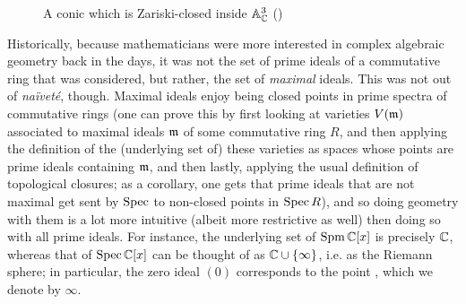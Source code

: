 \begin{example}
\begin{enumerate}
\begin{figure}[H]
                            \caption{A conic which is Zariski-closed inside $\mathbb{A}^3_{\mathbb{C}}$ (\cite[Figure 3.4]{risingsea})}
                            \label{fig: conic}
                        \end{figure}
                \end{enumerate}
            \end{example}
            
            \begin{remark}
                Historically, because mathematicians were more interested in complex algebraic geometry back in the days, it was not the set of prime ideals of a commutative ring that was considered, but rather, the set of \textit{maximal} ideals. This was not out of \textit{na\"ivet\'e}, though. Maximal ideals enjoy being closed points in prime spectra of commutative rings (one can prove this by first looking at varieties $V(\mathfrak{m})$ associated to maximal ideals $\mathfrak{m}$ of some commutative ring $R$, and then applying the definition of the (underlying set of) these varieties as spaces whose points are prime ideals containing $\mathfrak{m}$, and then lastly, applying the usual definition of topological closures; as a corollary, one gets that prime ideals that are not maximal get sent by $\operatorname{Spec}$ to non-closed points in $\operatorname{Spec} R$), and so doing geometry with them is a lot more intuitive (albeit more restrictive as well) then doing so with all prime ideals. For instance, the underlying set of $\operatorname{Spm} \mathbb{C}[x]$ is precisely $\mathbb{C}$, whereas that of $\operatorname{Spec} \mathbb{C}[x]$ can be thought of as $\mathbb{C} \cup \{\infty\}$, i.e. as the Riemann sphere; in particular, the zero ideal $(0)$ corresponds to the point , which we denote by $\infty$. 
            \end{remark}
            
